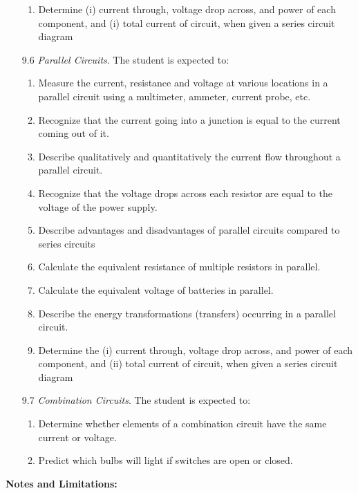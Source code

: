 \documentclass[dvipsnames]{article}
\begin{document}
\begin{enumerate}
\begin{enumerate}
        \item Determine (i) current through, voltage drop across, and power of each component, and (i) total current of circuit, when given a series circuit diagram
    \end{enumerate}
    \item[9.6] \textit{Parallel Circuits}. The student is expected to:
    \begin{enumerate}
        \item Measure the current, resistance and voltage at various locations in a parallel circuit using a multimeter, ammeter, current probe, etc.
        \item Recognize that the current going into a junction is equal to the current coming out of it.
        \item Describe qualitatively and quantitatively the current flow throughout a parallel circuit.
        \item Recognize that the voltage drops across each resistor are equal to the voltage of the power supply.
        \item Describe advantages and disadvantages of parallel circuits compared to series circuits
        \item Calculate the equivalent resistance of multiple resistors in parallel.
        \item Calculate the equivalent voltage of batteries in parallel.
        \item Describe the energy transformations (transfers) occurring in a parallel circuit.
        \item Determine the (i) current through, voltage drop across, and power of each component, and (ii) total current of circuit, when given a series circuit diagram
    \end{enumerate}
    \item[9.7] \textit{Combination Circuits}. The student is expected to:
    \begin{enumerate}
        \item Determine whether elements of a combination circuit have the same current or voltage.
        \item Predict which bulbs will light if switches are open or closed.
    \end{enumerate}
\end{enumerate}


\textbf{Notes and Limitations:}
\end{document}
